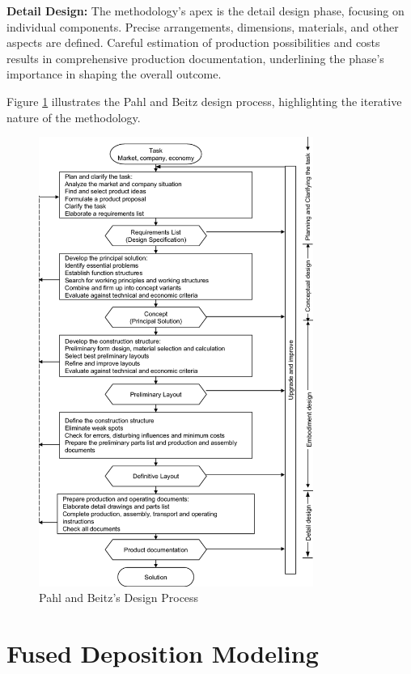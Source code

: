 \textbf{Detail Design:} The methodology's apex is the detail design phase, focusing on individual components. Precise arrangements, dimensions, materials, and other aspects are defined. Careful estimation of production possibilities and costs results in comprehensive production documentation, underlining the phase's importance in shaping the overall outcome.

Figure \ref{fig:pahlprocess} illustrates the Pahl and Beitz design process, highlighting the iterative nature of the methodology.


\begin{figure}[ht!]
    \centering
    \includegraphics[width=0.8\textwidth]{texs/Part1/chapter1/image/pahlprocess.png}
    \caption{Pahl and Beitz's Design Process \cite{Pahl07l}}
    \label{fig:pahlprocess}
\end{figure}

\section{Fused Deposition Modeling}
\label{sec:fused_deposition_modeling}

